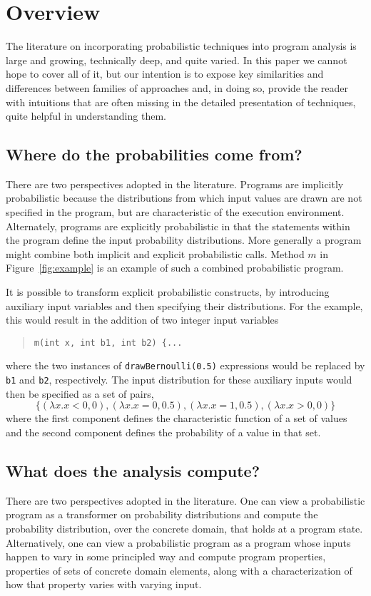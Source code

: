 \section{Overview}
\label{sec:overview}

The literature on incorporating probabilistic techniques into 
program analysis is large and growing, technically deep, and quite
varied.  In this paper we cannot hope to cover all of it, but our
intention is to expose key similarities and differences between 
families of approaches and, in doing so, provide the reader with
intuitions that are often missing in the detailed presentation of
techniques, quite helpful in understanding them.

\subsection{Where do the probabilities come from?}
There are two perspectives adopted in the literature.
Programs are implicitly probabilistic because the distributions
from which input values are drawn are not specified in the program,
but are characteristic of the execution environment.
Alternately, programs are explicitly probabilistic in that the statements
within the program define the input probability distributions.
More generally a program might combine both implicit and explicit
probabilistic calls.  Method $m$ in Figure~\ref{fig:example}
is an example of such a combined probabilistic program.

It is possible to transform explicit probabilistic constructs,
by introducing auxiliary input variables and then specifying
their distributions.   For the example, this would result
in the addition of two integer input variables 
\begin{quote}
\texttt{m(int x, int b1, int b2) \{...} 
\end{quote}
where the two instances of
\texttt{drawBernoulli(0.5)} expressions would be replaced
by \texttt{b1} and \texttt{b2}, respectively.  The input
distribution for these auxiliary inputs would then be specified
as a set of pairs,
\[
\{ (\lambda x.x<0,0), (\lambda x.x=0,0.5), (\lambda x.x=1,0.5), (\lambda x.x>0,0) \}
\]
where the first component defines the characteristic function
of a set of values and the second component defines the probability
of a value in that set.

\subsection{What does the analysis compute?}
There are two perspectives adopted in the literature.
One can view a probabilistic program as a transformer on probability
distributions and compute the probability distribution, over the
concrete domain, that holds at a program state.
Alternatively, one can view a probabilistic program as a program whose inputs happen
to vary in some principled way and compute program properties, 
properties of sets of concrete domain elements, along with a characterization
of how that property varies with varying input.

